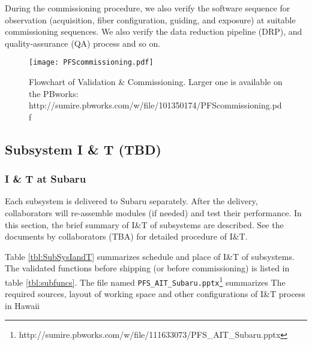 During the commissioning procedure, we also verify the software sequence for observation (acquisition, fiber configuration, guiding, and exposure) at suitable commissioning sequences.
We also verify the data reduction pipeline (DRP), and quality-assurance (QA) process and so on.

\begin{landscape}
\begin{figure}[!ht]
\begin{center}
\vspace*{0mm}
\hspace*{-10mm}
\texttt{[image: PFScommissioning.pdf]}
\end{center}
\vspace*{-8mm}
\caption{Flowchart of Validation \& Commissioning. Larger one is available on the PBworks: \newline
http://sumire.pbworks.com/w/file/101350174/PFScommissioning.pdf
}
\label{fig:flowchart}
\end{figure}
\end{landscape}

\subsection{Subsystem I \& T (TBD)}
\subsubsection{I \& T at Subaru}
Each subsystem is delivered to Subaru separately.
After the delivery, collaborators will re-assemble modules (if needed) and test their performance.
In this section, the brief summary of I\&T of subsystems are described.
See the documents by collaborators (TBA) for detailed procedure of I\&T.

Table \ref{tbl:SubSysIandT} summarizes schedule and place of I\&T of subsystems.
The validated functions before shipping (or before commissioning) is listed in table \ref{tbl:subfuncs}.
The file named {\tt PFS\_AIT\_Subaru.pptx}\footnote{http://sumire.pbworks.com/w/file/111633073/PFS\_AIT\_Subaru.pptx} summarizes The required sources, layout of working space and other configurations of I\&T process in Hawaii

